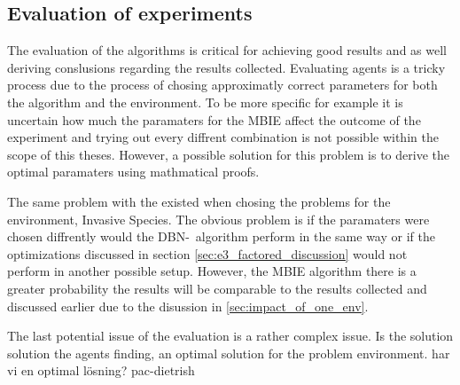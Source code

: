 \subsection{Evaluation of experiments }
The evaluation of the algorithms is critical for achieving good results and as well deriving conslusions regarding the results collected. Evaluating agents is a tricky process due to the process of chosing approximatly correct parameters for both the algorithm and the environment. To be more specific for example it is uncertain how much the paramaters for the MBIE affect the outcome of the experiment and trying out every diffrent combination is not possible within the scope of this theses. However, a possible solution for this problem is to derive the optimal paramaters using mathmatical proofs.

The same problem with the existed when chosing the problems for the environment, Invasive Species. The obvious problem is if the paramaters were chosen diffrently would the DBN-\etre\ algorithm perform in the same way or if the optimizations discussed in section \ref{sec:e3_factored_discussion} would not perform in another possible setup. However, the MBIE algorithm there is a greater probability the results will be comparable to the results collected and discussed earlier due to the disussion in \ref{sec:impact_of_one_env}.

The last potential issue of the evaluation is a rather complex issue. Is the solution solution the agents finding, an optimal solution for the problem environment. 
har vi en optimal lösning? pac-dietrish